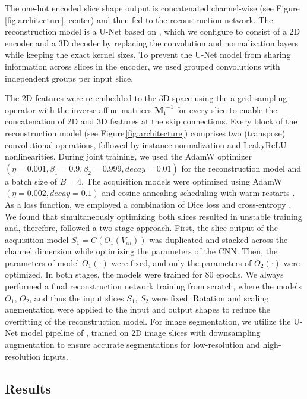     The one-hot encoded slice shape output is concatenated channel-wise (see Figure\,\ref{fig:architecture}, center)
    and then fed to the reconstruction network.
    The reconstruction model is a U-Net based on \cite{isensee2021nnu}, which we configure to consist of a 2D encoder and a 3D decoder by replacing the convolution and normalization layers while keeping the exact kernel sizes.
    To prevent the U-Net model from sharing information across slices in the encoder, we used grouped convolutions with independent groups per input slice.

    The 2D features were re-embedded to the 3D space using the a grid-sampling operator with the inverse affine matrices $\mathbf{M_i}^{-1}$ for every slice to enable the concatenation of 2D and 3D features at the skip connections.
    Every block of the reconstruction model (see Figure\,\ref{fig:architecture}) comprises two (transpose) convolutional operations, followed by instance normalization and LeakyReLU nonlinearities.
    During joint training, we used the AdamW optimizer \cite{loshchilov2017decoupled} $(\eta=0.001, \beta_1=0.9, \beta_2=0.999, decay=0.01)$ for the reconstruction model and a batch size of $B=4$.
    The acquisition models were optimized using AdamW $(\eta=0.002, decay=0.1)$ and cosine annealing scheduling with warm restarts \cite{loshchilov2016sgdr}.
    As a loss function, we employed a combination of Dice loss and cross-entropy \cite{isensee2021nnu}.
    We found that simultaneously optimizing both slices resulted in unstable training and, therefore, followed a two-stage approach. First, the slice output of the acquisition model $S_1 = C(O_1(V_{in}))$ was duplicated and stacked across the channel dimension while optimizing the parameters of the CNN. Then, the parameters of model $O_1(\cdot)$ were fixed, and only the parameters of $O_2(\cdot)$ were optimized. In both stages, the models were trained for 80 epochs.
    We always performed a final reconstruction network training from scratch, where the models $O_1$, $O_2$, and thus the input slices $S_1$, $S_2$ were fixed.
    Rotation and scaling augmentation were applied to the input and output shapes to reduce the overfitting of the reconstruction model.
    For image segmentation, we utilize the U-Net model pipeline of \cite{isensee2021nnu}, trained on 2D image slices with downsampling augmentation to ensure accurate segmentations for low-resolution and high-resolution inputs.

    \subsection{Results}
